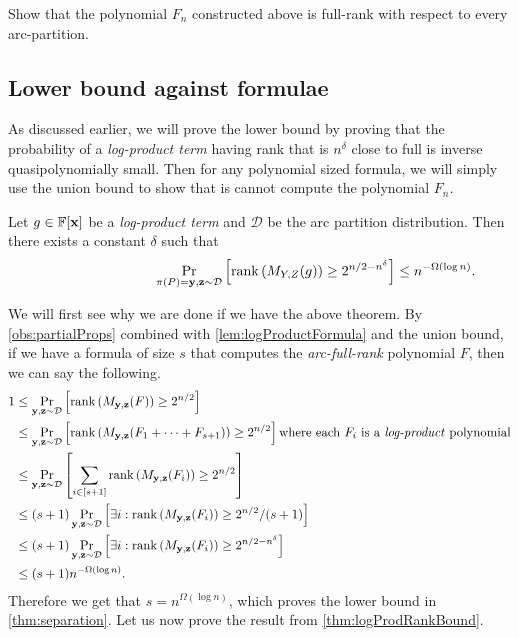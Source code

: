 \begin{exercise}
  Show that the polynomial $F_n$ constructed above is full-rank with respect to every arc-partition.
\end{exercise}


\subsection{Lower bound against formulae}

As discussed earlier, we will prove the lower bound by proving that the probability of a \emph{log-product term} having rank that is $n^{\delta}$ close to full is inverse quasipolynomially small. Then for any polynomial sized formula, we will simply use the union bound to show that is cannot compute the polynomial $F_n$.

\begin{theorem}
\label{thm:logProdRankBound}
Let $g \in \mathbb{F}[\mathbf{x}]$ be a \emph{log-product term} and $\mathcal{D}$ be the arc partition distribution. Then there exists a constant $\delta$ such that
\[
\qquad \qquad \qquad \qquad \Pr_{\pi(P)=\mathbf{y},\mathbf{z} \sim \mathcal{D}} \left[\operatorname{rank}\left(M_{Y,Z}(g)\right) \geq 2^{n/2 - n^{\delta}}\right] \leq n^{-\Omega(\log n)}.
\]
\end{theorem}

We will first see why we are done if we have the above theorem. By \autoref{obs:partialProps} combined with \autoref{lem:logProductFormula} and the union bound, if we have a formula of size $s$ that computes the \emph{arc-full-rank} polynomial $F$, then we can say the following.
\begin{align*}
1 &\leq \Pr_{\mathbf{y},\mathbf{z} \sim \mathcal{D}} \left[ \operatorname{rank}\left(M_{\mathbf{y},\mathbf{z}}(F)\right) \geq 2^{n/2}\right]\\
  &\leq \Pr_{\mathbf{y},\mathbf{z} \sim \mathcal{D}} \left[ \operatorname{rank}\left(M_{\mathbf{y},\mathbf{z}}(F_1 + \cdots + F_{s+1})\right) \geq 2^{n/2}\right] \text{where each $F_i$ is a \emph{log-product} polynomial}\\
  &\leq \Pr_{\mathbf{y},\mathbf{z} \sim \mathcal{D}} \left[ \sum_{i \in [s+1]} \operatorname{rank}\left(M_{\mathbf{y},\mathbf{z}}(F_i)\right) \geq 2^{n/2}\right]\\
  &\leq (s+1) \Pr_{\mathbf{y},\mathbf{z} \sim \mathcal{D}} \left[ \exists i : \operatorname{rank}\left(M_{\mathbf{y},\mathbf{z}}(F_i)\right) \geq 2^{n/2}/(s+1)\right]\\
  &\leq (s+1) \Pr_{\mathbf{y},\mathbf{z} \sim \mathcal{D}} \left[ \exists i : \operatorname{rank}\left(M_{\mathbf{y},\mathbf{z}}(F_i)\right) \geq 2^{n/2 - n^{\delta}}\right]\\
  &\leq (s+1) n^{-\Omega(\log n)}.
\end{align*}
Therefore we get that $s = n^{\Omega(\log n)}$, which proves the lower bound in \autoref{thm:separation}. Let us now prove the result from \autoref{thm:logProdRankBound}.

